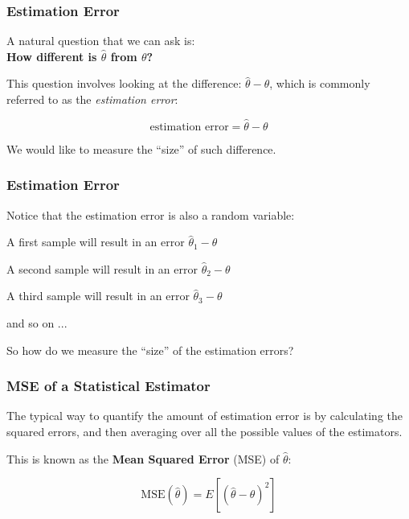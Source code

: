 \documentclass[12pt]{beamer}\usepackage[]{graphicx}\usepackage[]{color}
\begin{document}
\begin{frame}
\frametitle{Estimation Error}

A natural question that we can ask is: \\
{\mdlit \textbf{How different is $\hat{\theta}$ from $\theta$?}}

\bigskip 
This question involves looking at the difference: $\hat{\theta} - \theta$,
which is commonly referred to as the \textit{estimation error}:

{\large
$$
\text{estimation error} = \hat{\theta} - \theta
$$
}

We would like to measure the ``size'' of such difference.

\end{frame}


\begin{frame}
\frametitle{Estimation Error}

Notice that the estimation error is also a random variable:
\bi
  \item A first sample will result in an error $\hat{\theta}_1 - \theta$
  \item A second sample will result in an error $\hat{\theta}_2 - \theta$
  \item A third sample will result in an error $\hat{\theta}_3 - \theta$
  \item and so on ...
\ei

\bigskip
So how do we measure the ``size'' of the estimation errors?

\end{frame}


\begin{frame}
\frametitle{MSE of a Statistical Estimator}

The typical way to quantify the amount of estimation error is by calculating
the squared errors, and then averaging over all the possible values of the estimators.

\bigskip
This is known as the \textbf{Mean Squared Error} (MSE) of $\hat{\theta}$:

{\large
$$
\text{MSE}(\hat{\theta}) = E \left [ (\hat{\theta} - \theta)^2 \right ]
$$
}

\end{frame}

\end{document}
